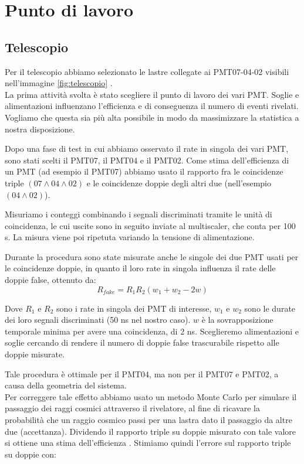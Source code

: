 \documentclass[10pt,a4paper]{article}
\begin{document}
\section{Punto di lavoro}\label{sec:Punto_lavoro}

\subsection{Telescopio} \label{subsec:telescopio}
\begin{flushleft}
Per il telescopio abbiamo selezionato le lastre collegate ai PMT07-04-02 visibili nell'immagine \ref{fig:telescopio} .\\
La prima attività svolta è stato scegliere il punto di lavoro dei vari PMT. Soglie e alimentazioni influenzano l'efficienza e di conseguenza il numero di eventi rivelati. Vogliamo che questa sia più alta possibile in modo da massimizzare la statistica a nostra disposizione. 

Dopo una fase di test in cui abbiamo osservato il rate in singola dei vari PMT, sono stati scelti il PMT07, il PMT04 e il PMT02. Come stima dell'efficienza di un PMT (ad esempio il PMT07) abbiamo usato il rapporto fra le coincidenze triple $(07\land04\land02)$ e le coincidenze doppie degli altri due (nell'esempio $(04\land02)$). 

Misuriamo i conteggi combinando i segnali discriminati tramite le unità di coincidenza, le cui uscite sono in seguito inviate al multiscaler, che conta per 100 s. La misura viene poi ripetuta variando la tensione di alimentazione.

Durante la procedura sono state misurate anche le singole dei due PMT usati per le coincidenze doppie, in quanto il loro rate in singola influenza il rate delle doppie false, ottenuto da:
\begin{equation}
    \label{fake}
    R_{fake} = R_1 R_2 (w_1 + w_2 - 2w)
\end{equation}

Dove $R_1$ e $R_2$ sono i rate in singola dei PMT di interesse, $w_1$ e $w_2$ sono le durate dei loro segnali discriminati (50 ns nel nostro caso). $w$ è la sovrapposizione temporale minima per avere una coincidenza, di 2 ns. Sceglieremo alimentazioni e soglie cercando di rendere il numero di doppie false trascurabile rispetto alle doppie misurate.


Tale procedura è ottimale per il PMT04, ma non per il PMT07 e PMT02, a causa della geometria del sistema. \\
Per correggere tale effetto abbiamo usato un metodo Monte Carlo per simulare il passaggio dei raggi cosmici attraverso il rivelatore, al fine di ricavare la probabilità che un raggio cosmico passi per una lastra dato il passaggio da altre due (accettanza). 
Dividendo il rapporto triple su doppie misurato con tale valore si ottiene una stima dell'efficienza . Stimiamo quindi l'errore sul rapporto triple su doppie con: 


\end{flushleft}
\end{document}
